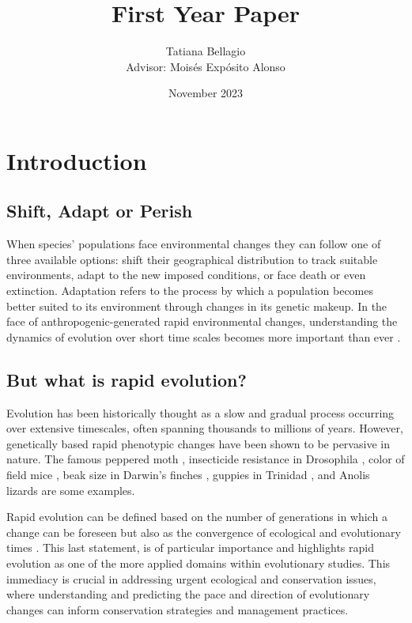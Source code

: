 \documentclass{article}
\title{First Year Paper} %
\author{Tatiana Bellagio \\ Advisor: Moisés Expósito Alonso}
\date{November 2023}
\begin{document}
\maketitle

\tableofcontents
\newpage %

\section{Introduction}
\subsection{Shift, Adapt or Perish}
When species' populations face environmental changes they can follow one of three available options: shift their geographical distribution to track suitable environments, adapt to the new imposed conditions, or face death or even extinction. Adaptation refers to the process by which a population becomes better suited to its environment through changes in its genetic makeup. In the face of anthropogenic-generated rapid environmental changes, understanding the dynamics of evolution over short time scales becomes more important than ever \citep{Waldvogel2020-dh}.

\subsection{But what is rapid evolution?}
Evolution has been historically thought as a slow and gradual process occurring over extensive timescales, often spanning thousands to millions of years. However, genetically based rapid phenotypic changes have been shown to be pervasive in nature. The famous peppered moth \citep{Cook2013-bs}, insecticide resistance in Drosophila \citep{Daborn2002-is}, color of field mice \citep{Vignieri2010-if}, beak size in Darwin’s finches \citep{Grant2008-uc}, guppies in Trinidad \citep{Kemp2009-ji}, and Anolis lizards \citep{Losos2009-vq} are some examples.

Rapid evolution can be defined based on the number of generations in which a change can be foreseen but also as the convergence of ecological and evolutionary times \citep{Hairston2005-qo}. This last statement, is of particular importance and highlights rapid evolution as one of the more applied domains within evolutionary studies. This immediacy is crucial in addressing urgent ecological and conservation issues, where understanding and predicting the pace and direction of evolutionary changes can inform conservation strategies and management practices. 
\end{document}
